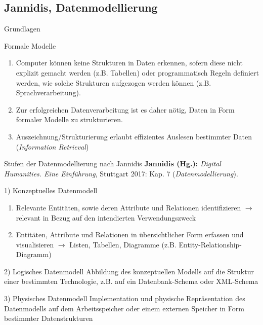 \subsection{Jannidis, Datenmodellierung}
\begin{frame}{Grundlagen}
    \begin{exampleblock}{Formale Modelle}\footnotesize
    \begin{enumerate}
        \item Computer können keine Strukturen in Daten erkennen, sofern diese nicht explizit gemacht werden (z.B. Tabellen) oder programmatisch Regeln definiert werden, wie solche Strukturen aufgezogen werden können (z.B. Sprachverarbeitung).
        \item Zur erfolgreichen Datenverarbeitung ist es daher nötig, Daten in Form formaler Modelle zu strukturieren.
        \item Auszeichnung/Strukturierung erlaubt effizientes Auslesen bestimmter Daten (\emph{Information Retrieval})
    \end{enumerate}
    \end{exampleblock}
\end{frame}

\begin{frame}{Stufen der Datenmodellierung nach Jannidis}
\textbf{Jannidis (Hg.):} \emph{Digital Humanities. Eine Einführung}, Stuttgart 2017: Kap. 7 (\emph{Datenmodellierung}).
\small
{}
    \begin{exampleblock}{1) Konzeptuelles Datenmodell}\footnotesize
        \begin{enumerate}
            \item Relevante Entitäten, sowie deren Attribute und Relationen identifizieren	$\to$ relevant in Bezug auf den intendierten Verwendungszweck
            \item Entitäten, Attribute und Relationen in übersichtlicher Form erfassen und visualisieren $\to$ Listen, Tabellen, Diagramme (z.B. Entity-Relationship-Diagramm)
        \end{enumerate}
    \end{exampleblock}
    \begin{exampleblock}{2) Logisches Datenmodell}
        Abbildung des konzeptuellen Modells auf die Struktur einer bestimmten Technologie, z.B. auf ein Datenbank-Schema oder XML-Schema
    \end{exampleblock}
    \begin{exampleblock}{3) Physisches Datenmodell}
        Implementation und physische Repräsentation des Datenmodells auf dem Arbeitsspeicher oder einem externen Speicher in Form bestimmter Datenstrukturen
    \end{exampleblock}
\end{frame}


